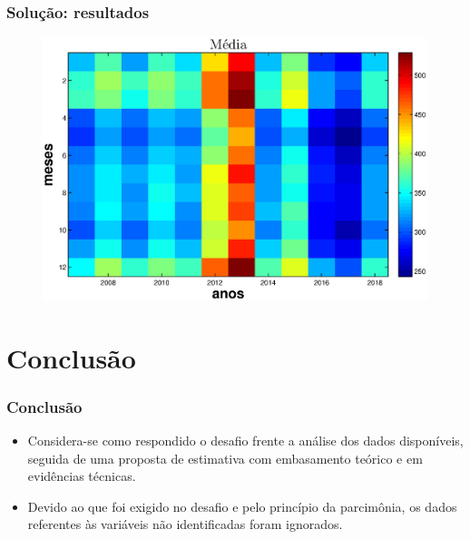 \documentclass[xcolor=dvipsnames,xcolor=table]{beamer}
\begin{document}
\begin{frame}\frametitle{Solução: resultados}
\begin{figure}[htpb] \begin{center} 
\includegraphics[width=0.9\columnwidth]{prev3}
\end{center}
\end{figure}
\end{frame}


\section{Conclusão}
\begin{frame}\frametitle{Conclusão}

\begin{itemize}
\item Considera-se como respondido o desafio frente a análise dos dados disponíveis, seguida de uma proposta de estimativa com embasamento teórico e em evidências técnicas.
\item Devido ao que foi exigido no desafio e pelo princípio da parcimônia, os dados referentes às variáveis não identificadas foram ignorados.
\end{itemize}

\end{frame}
\end{document}

